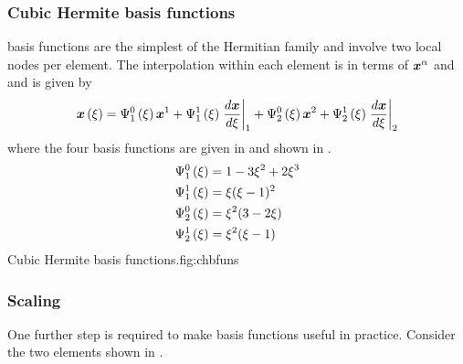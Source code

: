 \subsubsection{Cubic Hermite basis functions}

\Cubicherm basis functions are the simplest of the Hermitian family and
involve two local nodes per element. The interpolation within each element is
in terms of $\nodept{\vect{x}}{\alpha}$ and 
and is given by 
\begin{equation}
  \fnof{\vect{x}}{\xi}=\chbfn{1}{0}{\xi}\nodept{\vect{x}}{1}+\chbfn{1}{1}{\xi}
  \evalat{\dby{\vect{x}}{\xi}}{1}+\chbfn{2}{0}{\xi}\nodept{\vect{x}}{2}+
  \chbfn{2}{1}{\xi}\evalat{\dby{\vect{x}}{\xi}}{2}
  \label{eqn:chxiinterpolation}
\end{equation}
where the four \onedal \cubicherm basis functions are given in 
 and shown in .
\begin{equation}
  \begin{split}
    \chbfn{1}{0}{\xi} &= 1-3\xi^{2}+2\xi^{3} \\
    \chbfn{1}{1}{\xi} &= \xi(\xi-1)^{2} \\
    \chbfn{2}{0}{\xi} &= \xi^{2}(3-2\xi) \\
    \chbfn{2}{1}{\xi} &= \xi^{2}(\xi-1) 
  \end{split}
  \label{eqn:chbfuns}
\end{equation}
{Cubic Hermite basis functions.}{fig:chbfuns}

\subsubsection{Scaling}

One further step is required to make \cubicherm basis functions useful in
practice.  Consider the two \cubicherm elements shown in
.


